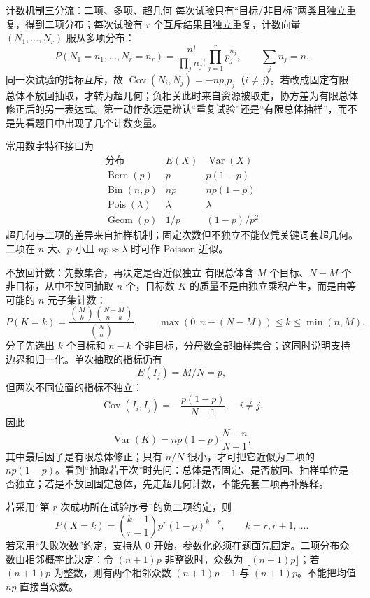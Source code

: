 \documentclass[11pt,a4paper]{ctexart}
\begin{document}
\begin{methodbox}{计数机制三分流：二项、多项、超几何}
每次试验只有“目标/非目标”两类且独立重复，得到二项分布；每次试验有 $r$ 个互斥结果且独立重复，计数向量 $(N_1,\ldots,N_r)$ 服从多项分布：
\[
P(N_1=n_1,\ldots,N_r=n_r)=\frac{n!}{\prod_jn_j!}\prod_{j=1}^rp_j^{n_j},\qquad \sum_jn_j=n.
\]
同一次试验的指标互斥，故 $\operatorname{Cov}(N_i,N_j)=-np_ip_j$（$i\ne j$）。若改成固定有限总体不放回抽取，才转为超几何；负相关此时来自资源被取走，协方差为有限总体修正后的另一表达式。第一动作永远是辨认“重复试验”还是“有限总体抽样”，而不是先看题目中出现了几个计数变量。
\end{methodbox}
常用数字特征接口为
\[
\begin{array}{c|c|c}
\text{分布}&E(X)&\operatorname{Var}(X)\\\hline
\operatorname{Bern}(p)&p&p(1-p)\\
\operatorname{Bin}(n,p)&np&np(1-p)\\
\operatorname{Pois}(\lambda)&\lambda&\lambda\\
\operatorname{Geom}(p)&1/p&(1-p)/p^2
\end{array}
\]
超几何与二项的差异来自抽样机制；固定次数但不独立不能仅凭关键词套超几何。二项在 $n$ 大、$p$ 小且 $np\approx\lambda$ 时可作 Poisson 近似。

\begin{methodbox}{不放回计数：先数集合，再决定是否近似独立}
有限总体含 $M$ 个目标、$N-M$ 个非目标，从中不放回抽取 $n$ 个，目标数 $K$ 的质量不是由独立乘积产生，而是由等可能的 $n$ 元子集计数：
\[
\boxed{P(K=k)=\frac{\binom{M}{k}\binom{N-M}{n-k}}{\binom{N}{n}}},
\qquad
\max(0,n-(N-M))\le k\le\min(n,M).
\]
分子先选出 $k$ 个目标和 $n-k$ 个非目标，分母数全部抽样集合；这同时说明支持边界和归一化。单次抽取的指标仍有
\[
E(I_j)=M/N=p,
\]
但两次不同位置的指标不独立：
\[
\operatorname{Cov}(I_i,I_j)= -\frac{p(1-p)}{N-1},\quad i\ne j.
\]
因此
\[
\operatorname{Var}(K)=np(1-p)\frac{N-n}{N-1},
\]
其中最后因子是有限总体修正；只有 $n/N$ 很小，才可把它近似为二项的 $np(1-p)$。看到“抽取若干次”时先问：总体是否固定、是否放回、抽样单位是否独立；若是不放回固定总体，先走超几何计数，不能先套二项再补解释。
\end{methodbox}

若采用“第 $r$ 次成功所在试验序号”的负二项约定，则
\[
P(X=k)=\binom{k-1}{r-1}p^r(1-p)^{k-r},\qquad k=r,r+1,\ldots.
\]
若采用“失败次数”约定，支持从 $0$ 开始，参数化必须在题面先固定。二项分布众数由相邻概率比决定：令 $(n+1)p$ 非整数时，众数为 $\lfloor(n+1)p\rfloor$；若 $(n+1)p$ 为整数，则有两个相邻众数 $(n+1)p-1$ 与 $(n+1)p$。不能把均值 $np$ 直接当众数。
\end{document}

